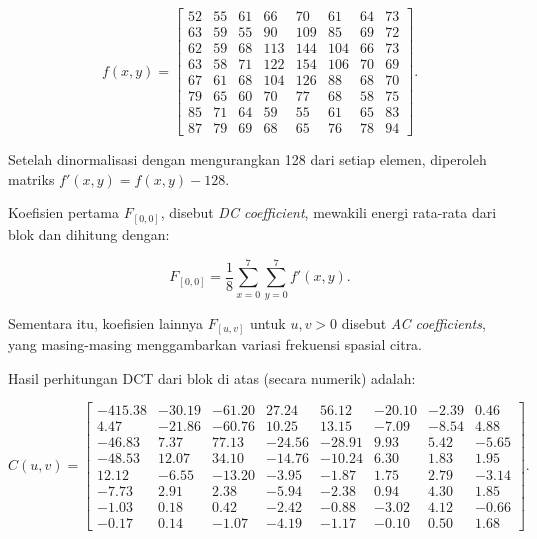 \documentclass[a4paper]{article}
\begin{document}
\[
  f(x,y) =
  \begin{bmatrix}
    52 & 55 & 61 & 66  & 70  & 61  & 64 & 73 \\
    63 & 59 & 55 & 90  & 109 & 85  & 69 & 72 \\
    62 & 59 & 68 & 113 & 144 & 104 & 66 & 73 \\
    63 & 58 & 71 & 122 & 154 & 106 & 70 & 69 \\
    67 & 61 & 68 & 104 & 126 & 88  & 68 & 70 \\
    79 & 65 & 60 & 70  & 77  & 68  & 58 & 75 \\
    85 & 71 & 64 & 59  & 55  & 61  & 65 & 83 \\
    87 & 79 & 69 & 68  & 65  & 76  & 78 & 94
  \end{bmatrix}.
\]

Setelah dinormalisasi dengan mengurangkan 128 dari setiap elemen, diperoleh matriks $f'(x,y) = f(x,y) - 128$.

Koefisien pertama $F_{[0,0]}$, disebut \textit{DC coefficient}, mewakili energi rata-rata dari blok dan dihitung dengan:

\[
  F_{[0,0]} = \frac{1}{8} \sum_{x=0}^{7}\sum_{y=0}^{7} f'(x,y).
\]

Sementara itu, koefisien lainnya $F_{[u,v]}$ untuk $u,v>0$ disebut \textit{AC coefficients}, yang masing-masing menggambarkan variasi frekuensi spasial citra.

Hasil perhitungan DCT dari blok di atas (secara numerik) adalah:

\[
  C(u,v) =
  \begin{bmatrix}
    -415.38 & -30.19 & -61.20 & 27.24  & 56.12  & -20.10 & -2.39 & 0.46  \\
    4.47    & -21.86 & -60.76 & 10.25  & 13.15  & -7.09  & -8.54 & 4.88  \\
    -46.83  & 7.37   & 77.13  & -24.56 & -28.91 & 9.93   & 5.42  & -5.65 \\
    -48.53  & 12.07  & 34.10  & -14.76 & -10.24 & 6.30   & 1.83  & 1.95  \\
    12.12   & -6.55  & -13.20 & -3.95  & -1.87  & 1.75   & 2.79  & -3.14 \\
    -7.73   & 2.91   & 2.38   & -5.94  & -2.38  & 0.94   & 4.30  & 1.85  \\
    -1.03   & 0.18   & 0.42   & -2.42  & -0.88  & -3.02  & 4.12  & -0.66 \\
    -0.17   & 0.14   & -1.07  & -4.19  & -1.17  & -0.10  & 0.50  & 1.68
  \end{bmatrix}.
\]
\end{document}
